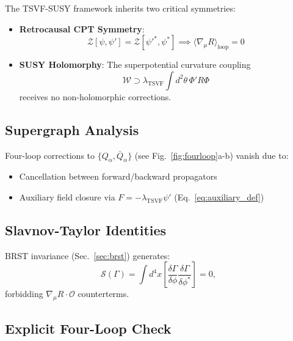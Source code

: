 \documentclass[12pt, onecolumn]{article}
\theoremstyle{definition}
\numberwithin{equation}{section}
\begin{document}
\begin{appendices}
The TSVF-SUSY framework inherits two critical symmetries:  
\begin{itemize}  
\item \textbf{Retrocausal CPT Symmetry}:  
\begin{equation}  
\mathcal{Z}[\psi, \psi'] = \mathcal{Z}[\psi'^*, \psi^*] \implies \langle \nabla_\mu R \rangle_{\text{loop}} = 0  
\label{eq:cpt}  
\end{equation}  

\item \textbf{SUSY Holomorphy}:  
The superpotential curvature coupling  
\begin{equation}  
\mathcal{W} \supset \lambda_{\text{TSVF}} \int d^2\theta \, \Phi' R \Phi  
\label{eq:holo}  
\end{equation}  
receives no non-holomorphic corrections.  
\end{itemize}

\subsection{Supergraph Analysis}  
\label{subsec:supergraph}

Four-loop corrections to $\{Q_\alpha, \bar{Q}_{\dot{\alpha}}\}$ (see Fig.~\ref{fig:fourloop}a-b) vanish due to:  
\begin{itemize}  
\item Cancellation between forward/backward propagators  
\item Auxiliary field closure via $F = -\lambda_{\text{TSVF}}\psi'$ (Eq.~\ref{eq:auxiliary_def})  
\end{itemize}

\subsection{Slavnov-Taylor Identities}  
\label{subsec:slavnov}

BRST invariance (Sec.~\ref{sec:brst}) generates:  
\begin{equation}  
\mathcal{S}(\Gamma) = \int d^4x \left[ \frac{\delta \Gamma}{\delta \phi} \frac{\delta \Gamma}{\delta \phi^*} \right] = 0,  
\label{eq:slavnov}  
\end{equation}  
forbidding $\nabla_\mu R \cdot \mathcal{O}$ counterterms.

\subsection{Explicit Four-Loop Check}  
\label{subsec:4loop}


\end{appendices}
\end{document}
